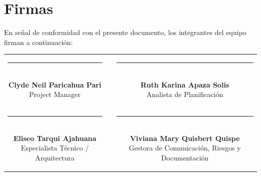 \documentclass[11pt,a4paper]{article}
\begin{document}
\section{Firmas}
\noindent En señal de conformidad con el presente documento, los integrantes del equipo firman a continuación:

\vspace{1.5cm}
\begin{center}
\begin{tabular}{c c c}
    \parbox{6.5cm}{\centering \rule{6.0cm}{0.6pt}\\[5pt] \textbf{Clyde Neil Paricahua Pari}\\[2pt] {\footnotesize Project Manager}}
    & \hspace{0.8cm} &
    \parbox{6.5cm}{\centering \rule{6.0cm}{0.6pt}\\[5pt] \textbf{Ruth Karina Apaza Solis}\\[2pt] {\footnotesize Analista de Planificación}}
    \\[2.0cm]
    \parbox{6.5cm}{\centering \rule{6.0cm}{0.6pt}\\[5pt] \textbf{Eliseo Tarqui Ajahuana}\\[2pt] {\footnotesize Especialista Técnico / Arquitectura}}
    & \hspace{0.8cm} &
    \parbox{6.5cm}{\centering \rule{6.0cm}{0.6pt}\\[5pt] \textbf{Viviana Mary Quisbert Quispe}\\[2pt] {\footnotesize Gestora de Comunicación, Riesgos y Documentación}}
\end{tabular}
\end{center}
\end{document}
